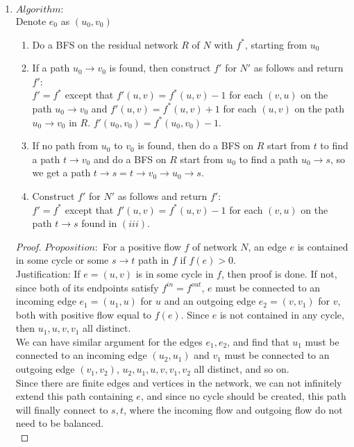 \documentclass[11pt]{article}
\begin{document}
\begin{enumerate}
\begin{enumerate}
    
    \item $Algorithm: $\\
        Denote $e_0$ as $(u_0, v_0)$
        \begin{enumerate}
            \item Do a BFS on the residual network $R$ of $N$ with $f^*$, starting from $u_0$\\
            \item If a path $u_0 \rightarrow v_0$ is found, then construct $f'$ for $N'$ as follows and return $f'$:\\
                $f' = f^*$ except that $f'(u,v) = f^*(u, v) - 1$ for each $(v, u)$ on the path $u_0 \rightarrow v_0$ and $f'(u,v) = f^*(u, v) + 1$ for each $(u, v)$ on the path $u_0 \rightarrow v_0$ in $R$. $f'(u_0, v_0) = f^*(u_0, v_0) - 1$.\\
            \item If no path from $u_0$ to $v_0$ is found, then do a BFS on $R$ start from $t$ to find a path $t\rightarrow v_0$ and do a BFS on $R$ start from $u_0$ to find a path $u_0 \rightarrow s$, so we get a path $t \rightarrow s = t\rightarrow v_0 \rightarrow u_0 \rightarrow s$.
            \item Construct $f'$ for $N'$ as follows and return $f'$: \\
                $f' = f^*$ except that $f'(u, v) = f^*(u, v) - 1$ for each $(v, u)$ on the path $t\rightarrow s$ found in $(iii)$.
        \end{enumerate}
    
    \begin{proof}
    $Proposition:$ For a positive flow $f$ of network $N$, an edge $e$ is contained in some cycle or some $s\rightarrow t$ path in $f$ if $f(e) > 0$.\\
    Justification: If $e = (u, v)$ is in some cycle in $f$, then proof is done. If not, since both of its endpoints satisfy $f^{in} = f^{out}$, $e$ must be connected to an incoming edge $e_1 = (u_1, u)$ for $u$ and an outgoing edge $e_2 = (v, v_1)$ for $v$, both with positive flow equal to $f(e)$. Since $e$ is not contained in any cycle, then $u_1, u, v, v_1$ all distinct.\\
    We can have similar argument for the edges $e_1, e_2$, and find that $u_1$ must be connected to an incoming edge $(u_2, u_1)$ and $v_1$ must be connected to an outgoing edge $(v_1, v_2)$, $u_2, u_1, u, v, v_1, v_2$ all distinct, and so on. \\
    Since there are finite edges and vertices in the network, we can not infinitely extend this path containing $e$, and since no cycle should be created, this path will finally connect to $s, t$, where the incoming flow and outgoing flow do not need to be balanced. \\[2ex]
    

\end{proof}
\end{enumerate}
\end{enumerate}
\end{document}
